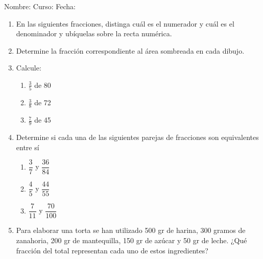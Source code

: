 \documentclass[fleqn]{article}
\newcommand{\LineaNombre}{%
\par
\vspace{\baselineskip}
Nombre:\hrulefill \; Curso: \underline{\hspace*{48pt}} \; Fecha: \underline{\hspace*{2.5cm}} \relax
\par}
\begin{document}
\LineaNombre
\begin{enumerate}
 \item En las siguientes fracciones, distinga cuál es el numerador y cuál es el denominador y ubíquelas sobre la recta numérica.
 \begin{enumerate}
 \end{enumerate}
 \item Determine la fracción correspondiente al área sombreada en cada dibujo.
 
 \item Calcule:
 \begin{enumerate}
 \item $\frac{3}{5}$ de 80 \noanswer
 \item $\frac{3}{8}$ de 72 \noanswer
 \item $\frac{7}{9}$ de 45 \noanswer
 \end{enumerate}
 \newpage
 \item Determine si cada una de las siguientes parejas de fracciones son equivalentes entre sí
 \begin{enumerate}
 \item $\dfrac{3}{7}$ y $\dfrac{36}{84}$ \noanswer[.5in]
 \item $\dfrac{4}{5}$ y $\dfrac{44}{55}$ \noanswer[.5in]
 \item $\dfrac{7}{11}$ y $\dfrac{70}{100}$ \noanswer[.5in]
 \end{enumerate}
 \item Para elaborar una torta se han utilizado 500 gr de harina, 300 gramos de zanahoria, 200 gr de mantequilla, 150 gr de azúcar y 50 gr de leche. ¿Qué fracción del total representan cada uno de estos ingredientes?\noanswer
 \end{enumerate}
\end{document}
